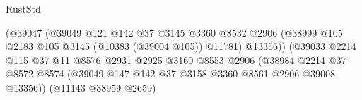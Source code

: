 \begin{lexlean}{RustStd}
\begin{coremodule}
                                                  (@39047
                                                    (@39049
                                                      @121
                                                      @142
                                                      @37
                                                      @3145
                                                      @3360
                                                      @8532
                                                      @2906
                                                      (@38999
                                                        @105
                                                        @2183
                                                        @105
                                                        @3145
                                                        (@10383 (@39004 @105))
                                                        @11781)
                                                      @13356))
                                                  (@39033
                                                    @2214
                                                    @115
                                                    @37
                                                    @11
                                                    @8576
                                                    @2931
                                                    @2925
                                                    @3160
                                                    @8553
                                                    @2906
                                                    (@38984
                                                      @2214
                                                      @37
                                                      @8572
                                                      @8574
                                                      (@39049
                                                        @147
                                                        @142
                                                        @37
                                                        @3158
                                                        @3360
                                                        @8561
                                                        @2906
                                                        @39008
                                                        @13356))
                                                    (@11143 @38959 @2659)

\end{coremodule}
\end{lexlean}

